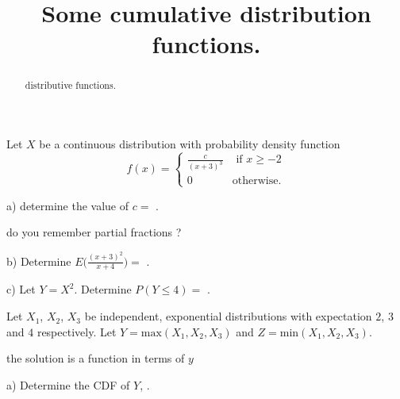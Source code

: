 \documentclass{ximera}
\title{Some cumulative distribution functions.}
\begin{document}
\begin{abstract}
distributive functions.
\end{abstract}
\maketitle

Let $X$ be a continuous distribution with probability density function 
\begin{equation*}
f(x)=
\begin{cases}
\frac{c}{(x+3)^{3}}  & \text{ if } x\geq -2  \\
0 & \text{otherwise.}
\end{cases}
\end{equation*}

\begin{question} 
     \begin{solution}
          a) determine the value of $c = $  .
     \end{solution}
\end{question}

\begin{question}
     \begin{hint}
          do you remember partial fractions ?
     \end{hint}
     \begin{solution}
          b) Determine $E\bigg( \frac{(x+3)^{2}}{x+4} \bigg) =$  .
     \end{solution}
\end{question}

\begin{question} 
     \begin{solution}
          c) Let $Y=X^{2}$. Determine $P(Y\leq 4) =$  .
     \end{solution}
\end{question}

Let $X_{1}$, $X_{2}$, $X_{3}$ be independent, exponential distributions with expectation $2$, $3$ and $4$ respectively. Let $Y=\text{max}(X_{1},X_{2},X_{3})$ and $Z=\text{min}(X_{1},X_{2},X_{3})$.


\begin{question}
     \begin{hint}
          the solution is a function in terms of $y$
     \end{hint}
     \begin{solution}
          a) Determine the CDF of $Y$, .
     \end{solution}
\end{question}
\end{document}
